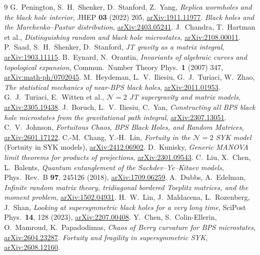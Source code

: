 \documentclass[11pt]{article}
\begin{document}
\begin{thebibliography}{9}
 G.~Penington, S.~H.~Shenker, D.~Stanford, Z.~Yang,
  \emph{Replica wormholes and the black hole interior}, JHEP \textbf{03} (2022) 205,
  \href{https://arxiv.org/abs/1911.11977}{arXiv:1911.11977}.
 \emph{Black holes and the Marchenko--Pastur distribution},
  \href{https://arxiv.org/abs/2403.05241}{arXiv:2403.05241}.
 J.~Chandra, T.~Hartman et al.,
  \emph{Distinguishing random and black hole microstates},
  \href{https://arxiv.org/abs/2108.00011}{arXiv:2108.00011}.
 P.~Saad, S.~H.~Shenker, D.~Stanford,
  \emph{JT gravity as a matrix integral}, \href{https://arxiv.org/abs/1903.11115}{arXiv:1903.11115}.
 B.~Eynard, N.~Orantin,
  \emph{Invariants of algebraic curves and topological expansion},
  Commun.\ Number Theory Phys.\ \textbf{1} (2007) 347,
  \href{https://arxiv.org/abs/math-ph/0702045}{arXiv:math-ph/0702045}.
 M.~Heydeman, L.~V.~Iliesiu, G.~J.~Turiaci, W.~Zhao,
  \emph{The statistical mechanics of near-BPS black holes},
  \href{https://arxiv.org/abs/2011.01953}{arXiv:2011.01953}.
 G.~J.~Turiaci, E.~Witten et al.,
  \emph{$\mathcal N=2$ JT supergravity and matrix models},
  \href{https://arxiv.org/abs/2305.19438}{arXiv:2305.19438}.
 J.~Boruch, L.~V.~Iliesiu, C.~Yan,
  \emph{Constructing all BPS black hole microstates from the gravitational path integral},
  \href{https://arxiv.org/abs/2307.13051}{arXiv:2307.13051}.
 C.~V.~Johnson,
  \emph{Fortuitous Chaos, BPS Black Holes, and Random Matrices},
  \href{https://arxiv.org/abs/2601.17122}{arXiv:2601.17122}.
 C.-M.~Chang, Y.-H.~Lin,
  \emph{Fortuity in the $\mathcal N{=}2$ SYK model} (Fortuity in SYK models),
  \href{https://arxiv.org/abs/2412.06902}{arXiv:2412.06902}.
 D.~Kunisky,
  \emph{Generic MANOVA limit theorems for products of projections},
  \href{https://arxiv.org/abs/2301.09543}{arXiv:2301.09543}.
 C.~Liu, X.~Chen, L.~Balents,
  \emph{Quantum entanglement of the Sachdev--Ye--Kitaev models}, Phys.\ Rev.\ B \textbf{97}, 245126 (2018),
  \href{https://arxiv.org/abs/1709.06259}{arXiv:1709.06259}.
 A.~Dubbs, A.~Edelman,
  \emph{Infinite random matrix theory, tridiagonal bordered Toeplitz matrices, and the moment problem},
  \href{https://arxiv.org/abs/1502.04931}{arXiv:1502.04931}.
 H.~W.~Lin, J.~Maldacena, L.~Rozenberg, J.~Shan,
  \emph{Looking at supersymmetric black holes for a very long time}, SciPost Phys.\ \textbf{14}, 128 (2023),
  \href{https://arxiv.org/abs/2207.00408}{arXiv:2207.00408}.
 Y.~Chen, S.~Colin-Ellerin, O.~Mamroud, K.~Papadodimas,
  \emph{Chaos of Berry curvature for BPS microstates},
  \href{https://arxiv.org/abs/2604.23287}{arXiv:2604.23287}.
 \emph{Fortuity and fragility in supersymmetric SYK},
  \href{https://arxiv.org/abs/2608.12160}{arXiv:2608.12160}.
\end{thebibliography}
\end{document}
